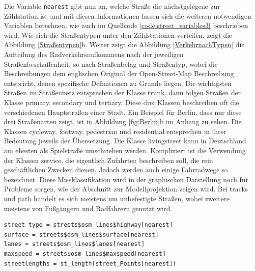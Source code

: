 \documentclass[a4paper,12pt]{thesis}
\begin{document}
Die Variable \lstinline|nearest| gibt nun an, welche Straße die nächstgelegene zur Zählstation ist und mit diesen Informationen lassen sich die weiteren notwendigen Variablen berechnen, wie auch im Quellcode \ref{code:street_variables3} beschrieben wird. Wie sich die Straßentypen unter den Zählstationen verteilen, zeigt die Abbildung \ref{Straßentypen}b. Weiter zeigt die Abbildung \ref{VerkehrnachTypen} die Aufteilung des Radverkehrsaufkommens nach der jeweiligen Straßenbeschaffenheit, so nach Straßenbelag und Straßentyp, wobei die Beschreibungen dem englischen Original der Open-Street-Map Beschreibung entspricht, denen spezifische Definitionen zu Grunde liegen. Die wichtigsten Straßen im Straßennetz entsprechen der Klasse \glqq{}trunk\grqq{}, dann folgen Straßen der Klasse \glqq{}primary\grqq{}, \glqq{}secondary\grqq{} und \glqq{}tertiary\grqq{}. Diese drei Klassen beschreiben oft die verschiedenen Hauptstraßen einer Stadt. Ein Beispiel für Berlin, dass nur diese drei Straßenarten zeigt, ist in Abbildung \ref{fig:Berlin}b im Anhang zu sehen. Die Klassen \glqq{}cycleway\grqq{}, \glqq{}footway\grqq{}, \glqq{}pedestrian\grqq{} und \glqq{}residential\grqq{} entsprechen in ihrer Bedeutung jeweils der Übersetzung. Die Klasse \glqq{}livingstreet\grqq{} kann in Deutschland am ehesten als Spielstraße umschrieben werden. Kompliziert ist die Verwendung der Klassen \glqq{}service\grqq{}, die eigentlich Zufahrten beschreiben soll, die rein geschäftlichen Zwecken dienen. Jedoch werden auch einige Fahrradwege so bezeichnet. Diese Missklassifikation wird in der graphischen Darstellung noch für Probleme sorgen, wie der Abschnitt zur Modellprojektion zeigen wird. Bei \glqq{}tracks\grqq{} und \glqq{}path\grqq{} handelt es sich meistens um unbefestigte Straßen, wobei zweitere meistens von Fußgängern und Radfahrern genutzt wird.

\begin{minipage}{\linewidth}
\begin{lstlisting}[caption={Berechnung der Straßenvariablen},label=code:street_variables3]
street_type = streets$osm_lines$highway[nearest]
surface = streets$osm_lines$surface[nearest]
lanes = streets$osm_lines$lanes[nearest]
maxspeed = streets$osm_lines$maxspeed[nearest]
streetlengths = st_length(street_Points[nearest])
\end{lstlisting}
\end{minipage}
\end{document}
